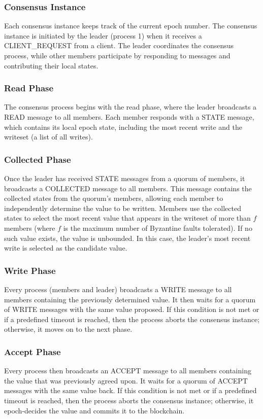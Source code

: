 \documentclass[runningheads]{llncs}
\begin{document}
\subsubsection{Consensus Instance}
Each consensus instance keeps track of the current epoch number. The consensus instance is initiated by the leader (process 1) when it receives a CLIENT\_REQUEST from a client. The leader coordinates the consensus process, while other members participate by responding to messages and contributing their local states.

\subsubsection{Read Phase}
The consensus process begins with the read phase, where the leader broadcasts a READ message to all members. Each member responds with a STATE message, which contains its local epoch state, including the most recent write and the writeset (a list of all writes).

\subsubsection{Collected Phase}
Once the leader has received STATE messages from a quorum of members, it broadcasts a COLLECTED message to all members. This message contains the collected states from the quorum's members, allowing each member to independently determine the value to be written. Members use the collected states to select the most recent value that appears in the writeset of more than \( f \) members (where \( f \) is the maximum number of Byzantine faults tolerated). If no such value exists, the value is unbounded. In this case, the leader's most recent write is selected as the candidate value.

\subsubsection{Write Phase}
Every process (members and leader) broadcasts a WRITE message to all members containing the previously determined value. It then waits for a quorum of WRITE messages with the same value proposed. If this condition is not met or if a predefined timeout is reached, then the process aborts the consensus instance; otherwise, it moves on to the next phase.

\subsubsection{Accept Phase}
Every process then broadcasts an ACCEPT message to all members containing the value that was previously agreed upon. It waits for a quorum of ACCEPT messages with the same value back. If this condition is not met or if a predefined timeout is reached, then the process aborts the consensus instance; otherwise, it epoch-decides the value and commits it to the blockchain.
\end{document}
